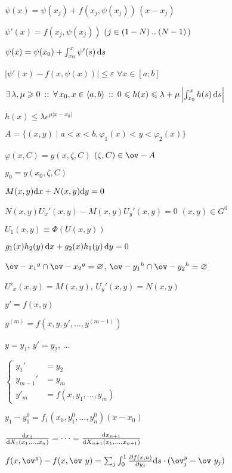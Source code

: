 \documentclass[timbord]{longnotes}
\begin{document}
\begin{list}
\skeq[4]
  \item $\psi (x) = \psi(x_j) + f(x_j, \psi(x_j))\, (x-x_j)$
  \item $\psi'(x) = f(x_j, \psi(x_j))$ 
    \hfill ($j\in (1-N) \mathbin{..} (N-1)$)
  \item $\psi (x) = \psi(x_0) + \int_{x_0}^x \psi'(s) \, \mathrm{d} s$
  \item $|\psi'(x) - f(x,\psi(x))| \leqslant \varepsilon$
    \hfill $\forall x\in [a;b]$
\skeq
  \item $\exists\, \lambda, \mu \geqslant 0 \:::\: 
    \forall\, x_0 , x\in \langle a,b \rangle \:::\: 
    0 \leqslant h(x) \leqslant\lambda+
    \mu \left|\int_{x_0}^x h(s) \,\mathrm{d} s \right|$
  \item $h(x) \leqslant \lambda e^{\mu |x-x_0|}$
\skeq
  \item $A = \{(x,y) \mid a<x<b, \varphi_1(x) <y<\varphi_2(x)\}$
  \item $\varphi(x,C) = y(x,\zeta, C)$
    \hfill $(\zeta,C) \in \ov-{A}$
  \item $y_0 = y(x_0, \zeta, C)$
\nch
  \item $M(x,y)\mathrm{d} x + N(x,y)\mathrm{d} y =0$
    \skeq[7]
  \item $N(x,y)U_x'(x,y) - M(x,y)U_y'(x,y)=0$ \hfill $(x,y) \in G^0$
  \item $U_1(x,y) \equiv \Phi(U(x,y))$
  \item $g_1(x)h_2(y) \, \mathrm{d} x+ g_2(x) h_1(y) \, \mathrm{d} y =0 $
  \item $\ov-{x_1}^g \cap \ov-{x_2}^g = \varnothing$, $\ov-{y_1}^h \cap \ov-{y_2}^h = \varnothing$
\skeq[4]
  \item $U'_x(x,y) = M(x,y)$, $U_y'(x,y) = N(x,y)$
\nch
  \item $y'=f(x,y)$
  \item $y^{(m)} = f(x,y,y', \dotsc, y^{(m-1)})$
  \item $y=y_1$, $y'=y_2$, ...
  \item 
    $ \left\{
    \begin{aligned}
      y_1' &= y_2 \\
      y_{m-1}' &= y_m \\
      y'_m &= f(x,y_1, \dotsc, y_m)
    \end{aligned} \right.
    $
  \item $y_1  - y_1^0 = f_1(x_0,y_1^0, \dotsc, y_n^0)(x-x_0)$
  \item $\fder{x_1}{X_1(x_1, \dotsc, x_n)} =\dotsb=\fder{x_{n+1}}{X_{n+1}(x_1, \dotsc, x_{n+1})}$
  \item $f(x, \ov^y)-f(x,\ov~y) = \sum_j \int_0^1\pder{f(x,u)}{y_j}\del s\cdot(\ov^y_j-\ov~y_j)$

\end{list}
\end{document}

